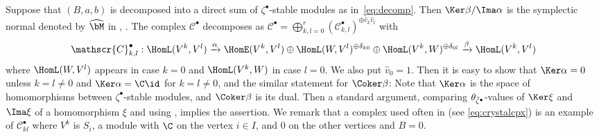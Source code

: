 Suppose that $(B,a,b)$ is decomposed into a direct sum of
$\zeta^\bullet$-stable modules as in~\eqref{eq:decomp}.
Then $\Ker\beta/\Ima\alpha$ is the symplectic normal denoted by
$\widehat\bM$ in \cite[Section~6]{Na-quiver}, \cite[Section~3.2]{Na-qaff}.
%
The complex $\mathscr{C}^\bullet$ decomposes as $\mathscr{C}^\bullet =
\bigoplus_{k,l=0}^r (\mathscr{C}_{k,l}^\bullet)^{\oplus {\widehat v}_k {\widehat
    v}_l}$ with
\begin{equation*}
   \mathscr{C}_{k,l}^\bullet :
   \HomL(V^k, V^l)
   \xrightarrow{\alpha}
   \HomE(V^k, V^l)
   \oplus \HomL(W, V^l)^{\oplus \delta_{k0}}
   \oplus \HomL(V^k, W)^{\oplus \delta_{0l}}
   \xrightarrow{\beta}
   \HomL(V^k, V^l)
\end{equation*}
where $\HomL(W, V^l)$ appears in case $k=0$ and $\HomL(V^k, W)$ in
case $l=0$. We also put $\widehat v_0 = 1$.
Then it is easy to show that $\Ker\alpha = 0$ unless $k = l \neq 0$
and $\Ker\alpha = \C \id$ for $k=l\neq 0$, and the similar statement
for $\Coker\beta$: Note that $\Ker\alpha$ is the space of
homomorphisms between $\zeta^\bullet$-stable modules, and $\Coker\beta$ is
its dual.
Then a standard argument, comparing
$\theta_{\Tilde\zeta^\bullet}$-values of $\Ker\xi$ and $\Ima\xi$ of a
homomorphism $\xi$ and using , implies the
assertion.
%
We remark that a complex used often in \cite{Na-alg} (see
\eqref{eq:crystalcpx}) is an example of $\mathscr{C}_{kl}^\bullet$
where $V^k$ is $S_i$, a module with $\C$ on the vertex $i\in I$, and
$0$ on the other vertices and $B = 0$.


